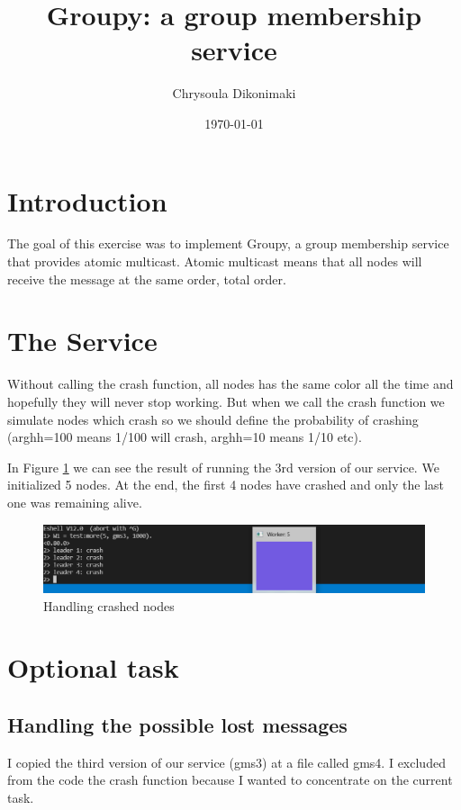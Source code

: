 \documentclass[a4paper, 11pt]{article}
\title{Groupy: a group membership service}
\author{Chrysoula Dikonimaki}
\date{\today{}}
\begin{document}
\maketitle

\section{Introduction}
The goal of this exercise was to implement Groupy, a group membership service that provides atomic multicast. Atomic multicast means that all nodes will receive the message at the same order, total order. 

\section{The Service}
Without calling the crash function, all nodes has the same color all the time and hopefully they will never stop working. But when we call the crash function we simulate nodes which crash so we should define the probability of crashing (arghh=100 means 1/100 will crash, arghh=10 means 1/10 etc). 

In Figure \ref{exp1} we can see the result of running the 3rd version of our service. We initialized 5 nodes. At the end, the first 4 nodes have crashed and only the last one was remaining alive.

\begin{figure}
  \begin{center}
    \includegraphics[scale=0.5]{exp1.PNG}
    \caption{Handling crashed nodes}
    \label{exp1}
  \end{center}
\end{figure}

\section{Optional task}
\subsection{Handling the possible lost messages}
I copied the third version of our service (gms3) at a file called gms4. I excluded from the code the crash function because I wanted to concentrate on the current task. 
\end{document}
